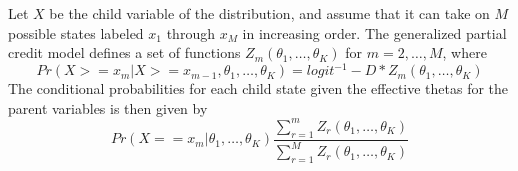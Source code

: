   Let $X$ be the child variable of the distribution, and assume that
  it can take on $M$ possible states labeled $x_1$ through
  $x_M$ in increasing order.  The generalized partial
  credit model defines a set of functions
  $Z_m(\theta_1,\ldots,\theta_K)$ for $m=2,\ldots,M$, where 
    $$Pr(X >= x_m | X >=x_{m-1}, \theta_1,\ldots,\theta_K) = logit^{-1}
    -D*Z_m(\theta_1,\ldots,\theta_K)$$
  The conditional probabilities for each child state given the effective
  thetas for the parent variables is then given by
  $$Pr(X == x_m |\theta_1,\ldots,\theta_K) \frac{\sum_{r=1}^m
  Z_r(\theta_1,\ldots,\theta_K)}{\sum_{r=1}^M
  Z_r(\theta_1,\ldots,\theta_K)}$$
